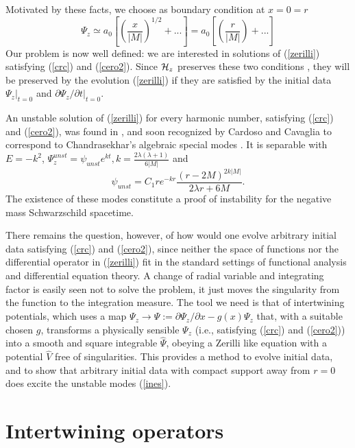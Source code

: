 \documentclass[aps,floats,showpacs,amssymb,tightenlines]{revtex4}
\def\p{\partial}
\begin{document}
 Motivated by these facts, we choose as boundary condition at $x=0=r$
\begin{equation} \label{cero2}
 \Psi_z \simeq a_0 \left[ \left(\frac{x}{|M|}\right)^{1/2}  + ... \right] = a_0 \left[ \left(\frac{r}{|M|}\right)  + ... \right]
 \end{equation}
Our problem is now well defined: we are interested in solutions of (\ref{zerilli}) satisfying (\ref{crc}) and
(\ref{cero2}). Since ${\cal H}_z$ preserves these two conditions \cite{dg}, they will be preserved by the evolution
(\ref{zerilli}) if they are satisfied by the initial data $\Psi_z|_{t=0}$ and $\p \Psi_z / \p t |_{t=0}$.

An unstable solution of (\ref{zerilli}) for every harmonic number, satisfying (\ref{crc}) and (\ref{cero2}),  was found in \cite{dg}, 
and soon recognized by Cardoso and Cavaglia \cite{cardoso}  to correspond to Chandrasekhar's algebraic special modes \cite{prs}.
It is separable with  $E=-k^2$,
$\Psi_z^{unst} = \psi_{unst} e^{kt}, k = \frac{2\lambda (\lambda+1)}{6|M|}$ and
\begin{equation}
\label{ines}
 \psi_{unst}  = C_1 r{e^{-kr}} \frac{\left( r-2M \right) ^{2 k |M|}}{2 \lambda r + 6M} .
\end{equation}
The
existence of these modes  constitute
a proof of instability for the negative mass Schwarzschild spacetime.

There remains the question, however, of how
would one evolve arbitrary initial data satisfying (\ref{crc}) and (\ref{cero2}), since neither the space of functions nor
the differential operator in (\ref{zerilli}) fit in the standard settings of functional analysis and differential equation theory.
A change of   radial  variable and integrating factor is easily seen not to solve the problem, it  just moves the singularity
from the function to the integration measure. The tool we need is that of intertwining potentials, which uses
a map $\Psi_z \to \hat \Psi := \p \Psi_z  / \p x - g(x) \Psi_z$ that, with a suitable chosen $g$, transforms
a physically sensible $\Psi_z$ (i.e., satisfying (\ref{crc}) and (\ref{cero2})) into a smooth
and square integrable  $\hat \Psi$, obeying a Zerilli like equation with a potential $\hat V$ free
of singularities.
This provides  a method to evolve initial data, and to show that arbitrary initial data with compact support
away from $r=0$ does excite the
unstable modes (\ref{ines}).






\section{Intertwining operators} \label{inter}
\end{document}
